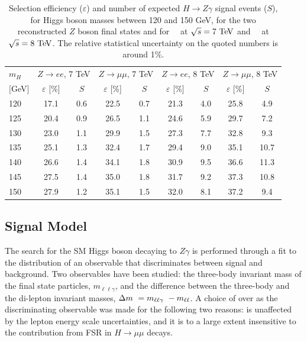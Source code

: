 \begin{table}[!htbp]
  \begin{center}
    \begin{tabular}{l|cc|cc|cc|cc}
\hline
\hline
$m_H$  & \multicolumn{2}{c|}{$Z\to ee$, 7 TeV} & \multicolumn{2}{c|}{$Z\to \mu\mu$, 7 TeV} & \multicolumn{2}{c|}{$Z\to ee$, 8 TeV} &  \multicolumn{2}{c}{$Z\to \mu\mu$, 8 TeV} \\
$[$GeV$]$ & $\varepsilon$ [\%] & $S$ & $\varepsilon$ [\%] & $S$ & $\varepsilon$ [\%] & $S$ & $\varepsilon$ [\%] & $S$ \\
\hline
120  &  17.1  &  0.6  &  22.5  &  0.7  &  21.3  &  4.0  &  25.8  &   4.9  \\
125  &  20.4  &  0.9  &  26.5  &  1.1  &  24.6  &  5.9  &  29.7  &   7.2  \\
130  &  23.0  &  1.1  &  29.9  &  1.5  &  27.3  &  7.7  &  32.8  &   9.3  \\
135  &  25.1  &  1.3  &  32.4  &  1.7  &  29.4  &  9.0  &  35.1  &  10.7  \\
140  &  26.6  &  1.4  &  34.1  &  1.8  &  30.9  &  9.5  &  36.6  &  11.3  \\
145  &  27.5  &  1.4  &  35.0  &  1.8  &  31.7  &  9.2  &  37.3  &  10.8  \\
150  &  27.9  &  1.2  &  35.1  &  1.5  &  32.0  &  8.1  &  37.2  &   9.4  \\
        \hline\hline
    \end{tabular}
  \caption{Selection efficiency ($\varepsilon$) and number of expected
    $H\to Z\gamma$ signal events ($S$),
    for Higgs boson masses between 120 and 150 GeV,
    for the two reconstructed $Z$ boson final states and
    for \lumiseventev~\ifb\ at $\sqrt{s}=7\TeV$
    and \lumieighttev~\ifb\ at $\sqrt{s}=8\TeV$.
    The relative statistical uncertainty on the quoted numbers
    is around 1\%.
  }
  \label{tab:expected_signalyields}
  \end{center}
\end{table}


\subsection{Signal Model}
The search for the SM Higgs boson decaying to $Z\gamma$ is performed through
a fit to the distribution of an observable that discriminates between signal
and background. Two observables have been studied: the three-body invariant
mass of the final state particles, $m_{\ell\ell\gamma}$,
and the difference between the three-body
and the di-lepton invariant masses, $\Delta m\  = m_{\ell \ell \gamma}\  - m_{\ell\ell}$.
A choice of \dm over \mllg as the discriminating observable was made for the 
following two reasons: \dm is unaffected by the lepton energy scale uncertainties, and
it is to a large extent insensitive to the contribution from FSR in $H\to\mu\mu$
decays.

